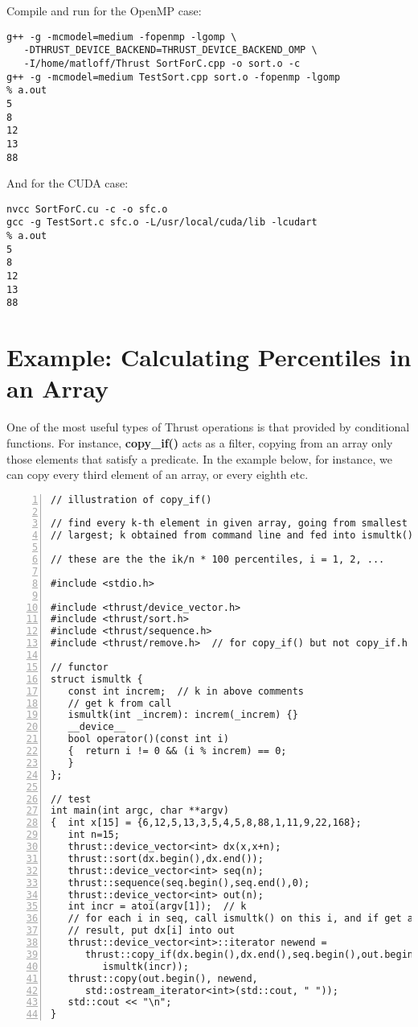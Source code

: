 Compile and run for the OpenMP case:

\begin{lstlisting}
g++ -g -mcmodel=medium -fopenmp -lgomp \
   -DTHRUST_DEVICE_BACKEND=THRUST_DEVICE_BACKEND_OMP \
   -I/home/matloff/Thrust SortForC.cpp -o sort.o -c
g++ -g -mcmodel=medium TestSort.cpp sort.o -fopenmp -lgomp
% a.out
5
8
12
13
88
\end{lstlisting}

And for the CUDA case:

\begin{lstlisting}
nvcc SortForC.cu -c -o sfc.o
gcc -g TestSort.c sfc.o -L/usr/local/cuda/lib -lcudart
% a.out
5
8
12
13
88
\end{lstlisting}

\section{Example:  Calculating Percentiles in an Array}

One of the most useful types of Thrust operations is that provided by
conditional functions.  For instance, {\bf copy\_if()} acts as a filter,
copying from an array only those elements that satisfy a predicate.  In
the example below, for instance, we can copy every third element of an
array, or every eighth etc.

\begin{lstlisting}[numbers=left]
// illustration of copy_if()

// find every k-th element in given array, going from smallest to
// largest; k obtained from command line and fed into ismultk() functor

// these are the the ik/n * 100 percentiles, i = 1, 2, ...

#include <stdio.h>

#include <thrust/device_vector.h>
#include <thrust/sort.h>
#include <thrust/sequence.h>
#include <thrust/remove.h>  // for copy_if() but not copy_if.h

// functor
struct ismultk {
   const int increm;  // k in above comments
   // get k from call
   ismultk(int _increm): increm(_increm) {}
   __device__
   bool operator()(const int i)
   {  return i != 0 && (i % increm) == 0;
   }
};

// test
int main(int argc, char **argv)
{  int x[15] = {6,12,5,13,3,5,4,5,8,88,1,11,9,22,168};  
   int n=15;
   thrust::device_vector<int> dx(x,x+n);
   thrust::sort(dx.begin(),dx.end());
   thrust::device_vector<int> seq(n);
   thrust::sequence(seq.begin(),seq.end(),0);
   thrust::device_vector<int> out(n);
   int incr = atoi(argv[1]);  // k
   // for each i in seq, call ismultk() on this i, and if get a true
   // result, put dx[i] into out
   thrust::device_vector<int>::iterator newend = 
      thrust::copy_if(dx.begin(),dx.end(),seq.begin(),out.begin(),
         ismultk(incr));
   thrust::copy(out.begin(), newend,
      std::ostream_iterator<int>(std::cout, " "));
   std::cout << "\n";
}

\end{lstlisting}

